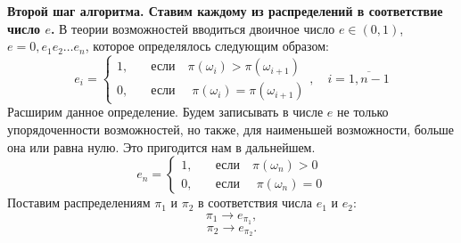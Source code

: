 \documentclass[a4paper, 14pt]{extarticle}
\begin{document}
\textbf{Второй шаг алгоритма. Ставим каждому из распределений в соответствие число $e$.} В теории возможностей \cite{pytev-poss-textbook-main} вводиться двоичное число $e \in (0,1)$, $e=0,e_1e_2\ldots e_n$,
которое определялось следующим образом:
\begin{equation}
    e_i =
      \begin{cases}
        1,    & \quad \text{если} \quad \pi(\omega_i) > \pi(\omega_{i+1})\\
        0,  & \quad \text{если } \quad \pi(\omega_i) = \pi(\omega_{i+1})
      \end{cases},\quad i = \overline{1, n-1}
\end{equation}
Расширим данное определение. Будем записывать в числе $e$ не только упорядоченности возможностей, но также, для наименьшей возможности, больше она или равна нулю. Это пригодится нам в дальнейшем.
\begin{equation}
    e_n =
      \begin{cases}
        1,    & \quad \text{если} \quad \pi(\omega_n) > 0\\
        0,  & \quad \text{если } \quad \pi(\omega_n) = 0
      \end{cases}
\end{equation}
Поставим распределениям $\pi_1$ и $\pi_2$ в соответствия числа $e_1$ и $e_2$:
$$\pi_1 \rightarrow e_{\pi_1},$$
$$\pi_2 \rightarrow e_{\pi_2}.$$
\end{document}
